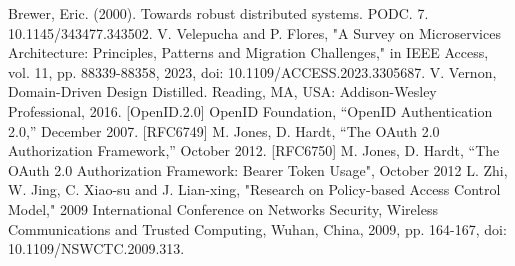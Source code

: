 \documentclass[letterpaper, 10 pt, conference]{ieeeconf}  %
\begin{document}

\begin{thebibliography}{99}
 Brewer, Eric. (2000). Towards robust distributed systems. PODC. 7. 10.1145/343477.343502. 
 V. Velepucha and P. Flores, "A Survey on Microservices Architecture: Principles, Patterns and Migration Challenges," in IEEE Access, vol. 11, pp. 88339-88358, 2023, doi: 10.1109/ACCESS.2023.3305687.
 V. Vernon, Domain-Driven Design Distilled. Reading, MA, USA: Addison-Wesley Professional, 2016.
 [OpenID.2.0] OpenID Foundation, “OpenID Authentication 2.0,” December 2007.
 [RFC6749]	M. Jones, D. Hardt, “The OAuth 2.0 Authorization Framework,” October 2012.
 [RFC6750]	M. Jones, D. Hardt, “The OAuth 2.0 Authorization Framework: Bearer Token Usage", October 2012
 L. Zhi, W. Jing, C. Xiao-su and J. Lian-xing, "Research on Policy-based Access Control Model," 2009 International Conference on Networks Security, Wireless Communications and Trusted Computing, Wuhan, China, 2009, pp. 164-167, doi: 10.1109/NSWCTC.2009.313.
\end{thebibliography}
\end{document}
